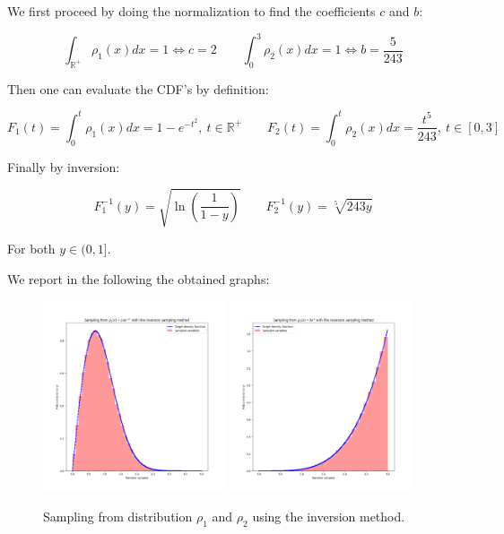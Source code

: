 We first proceed by doing the normalization to find the coefficients $c$ and $b$:

$$ \int_{\mathbb{R}^+}\rho_1(x)dx =1 \iff c=2 \qquad \int_{0}^3\rho_2(x)dx =1 \iff b = \frac{5}{243} $$

Then one can evaluate the CDF's by definition:

$$ F_1(t)=\int_{0}^t\rho_1(x)dx = 1-e^{-t^2}, \ t \in \mathbb{R}^+ \qquad F_2(t)=\int_{0}^t\rho_2(x)dx = \frac{t^5}{243}, \ t \in [0,3] $$

Finally by inversion:

$$ F^{-1}_1(y) = \sqrt{\ln\left(\frac{1}{1-y}\right)} \qquad F^{-1}_2(y)= \sqrt[5]{243 y}$$

For both $y \in (0,1]$.

We report in the following the obtained graphs:

\begin{figure}[t!]
\centering
\includegraphics[width=0.48\textwidth]{FIG/exercise_1_images/Figure_1.png}
\hfill
\includegraphics[width=0.48\textwidth]{FIG/exercise_1_images/Figure_2.png}
\caption{Sampling from distribution $\rho_1$ and $\rho_2$ using the inversion method.}
\label{fig:combined_figure}
\end{figure}